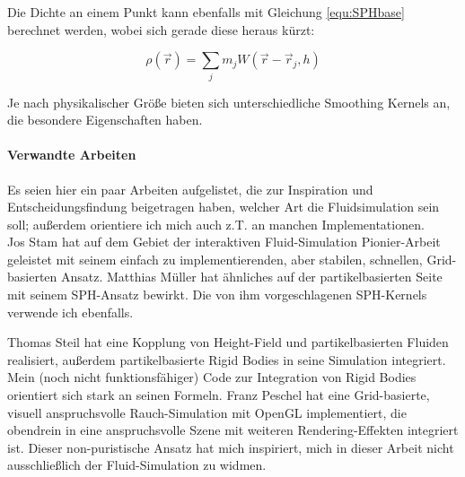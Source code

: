 		Die Dichte an einem Punkt kann ebenfalls mit Gleichung \ref{equ:SPHbase} berechnet werden, wobei sich 
		gerade diese heraus kürzt:
		
		\begin{equation} 
			\rho (\vec{r}) = \sum_j m_j  W(\vec{r}-\vec{r}_j,h)
		\end{equation}
		
		Je nach physikalischer Größe bieten sich unterschiedliche Smoothing Kernels an, die besondere
		Eigenschaften haben.		
		


		
		
	\paragraph{Verwandte Arbeiten}
	\label{sec:relatedWork}
	Es seien hier ein paar Arbeiten aufgelistet, die zur Inspiration und Entscheidungsfindung beigetragen haben,
	welcher Art die Fluidsimulation sein soll; außerdem orientiere ich mich auch z.T. an manchen Implementationen.\\
	
	Jos Stam \cite{Stam99stablefluids,Stam03realtimefluid} hat auf dem Gebiet der interaktiven Fluid-Simulation 
	Pionier-Arbeit geleistet mit seinem einfach zu implementierenden, aber stabilen, schnellen, Grid-basierten 
	Ansatz. Matthias Müller \cite{Muller2003} hat ähnliches auf der partikelbasierten Seite mit seinem SPH-Ansatz
	bewirkt. Die von ihm vorgeschlagenen SPH-Kernels verwende ich ebenfalls.
		
	Thomas Steil \cite{Steil2007} hat eine Kopplung von Height-Field und partikelbasierten Fluiden
	realisiert, außerdem partikelbasierte Rigid Bodies in seine Simulation integriert.
	Mein (noch nicht funktionsfähiger) Code zur Integration von Rigid Bodies orientiert sich stark an seinen Formeln.
	Franz Peschel hat eine Grid-basierte, visuell anspruchsvolle Rauch-Simulation mit OpenGL implementiert,
	die obendrein in eine anspruchsvolle Szene mit weiteren Rendering-Effekten integriert ist. Dieser
	non-puristische Ansatz hat mich inspiriert, mich in dieser Arbeit nicht ausschließlich der Fluid-Simulation zu widmen.
	
